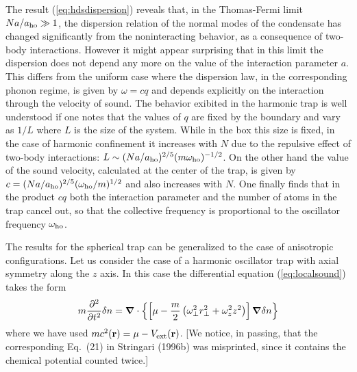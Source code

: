 The result (\ref{eq:hdsdispersion}) reveals that, in the Thomas-Fermi 
limit $Na/a_{\rm ho}\gg 1$, the dispersion relation of the normal modes
of the condensate has changed significantly from the noninteracting 
behavior, as a consequence of two-body interactions. However it might 
appear surprising that in this limit the dispersion does not depend any 
more on the value of the interaction parameter $a$. This  differs from the 
uniform case where the dispersion law, in the corresponding phonon regime,
is given by $\omega =cq$ and depends explicitly on the interaction
through the  velocity of sound. The behavior exibited in  the harmonic
trap is well understood if  one notes that the values of $q$ are fixed by the
boundary and vary as $1/L$  where $L$ is the size of the system. While in
the box this size is fixed, in the case of harmonic confinement it increases
with $N$ due to the repulsive effect of two-body interactions: $L\sim
(Na/a_{\rm ho})^{2/5}(m\omega_{\rm ho})^{-1/2}$. On the other hand the 
value of the sound velocity, calculated at the center of the trap, is 
given by  $c= (Na/a_{\rm ho})^{2/5}(\omega_{\rm ho}/m)^{1/2}$ and
also increases with $N$. One finally finds that  in the product $cq$ both
the interaction parameter and the number of  atoms in the trap cancel out, 
so that the collective frequency is  proportional to  the oscillator 
frequency $\omega_{\rm ho}$.

The results  for the spherical trap can be generalized to the case of
anisotropic configurations.   Let us consider the case of a harmonic
oscillator trap with axial symmetry along the $z$ axis. In this case the
differential equation (\ref{eq:localsound}) takes the form
\begin{equation}
m { \partial^2 \over \partial t^2 } \delta n =
\mbox{\boldmath$\nabla$} \cdot \left\{
\left[ \mu - {m\over2} \left( \omega_\perp^2 r_\perp^2 
+  \omega_z^2 z^2  \right) \right] \mbox{\boldmath$\nabla$} 
\delta n \right\}
\label{eq:hddeformed}
\end{equation}
where we have used $mc^2({\bf r})=\mu-V_{\rm ext}({\bf r})$. [We notice,
in passing, that the corresponding Eq.~(21) in Stringari (1996b) was
misprinted, since it contains the chemical potential counted twice.] 

